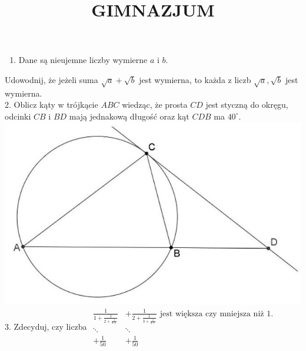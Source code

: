 \documentclass[10pt]{article}
\title{GIMNAZJUM }
\author{}
\date{}
\begin{document}
\maketitle
\begin{enumerate}
  \item Dane są nieujemne liczby wymierne \(a\) i \(b\).
\end{enumerate}

Udowodnij, że jeżeli suma \(\sqrt{a}+\sqrt{b}\) jest wymierna, to każda z liczb \(\sqrt{a}, \sqrt{b}\) jest wymierna.\\
2. Oblicz kąty w trójkącie \(A B C\) wiedząc, że prosta \(C D\) jest styczną do okręgu, odcinki \(C B\) i \(B D\) mają jednakową długość oraz kąt \(C D B\) ma \(40^{\circ}\).\\
\includegraphics[max width=\textwidth, center]{2024_11_21_92e4b017f3ebdb44cbd9g-1}\\
3. Zdecyduj, czy liczba \(\begin{array}{cc}\frac{1}{1+\frac{1}{2+\frac{1}{3+}}} & +\frac{1}{2+\frac{1}{3+\frac{1}{4+}}} \text { jest większa czy mniejsza niż } 1 . \\ \ddots & \ddots \\ +\frac{1}{50} & +\frac{1}{50}\end{array}\)
\end{document}
